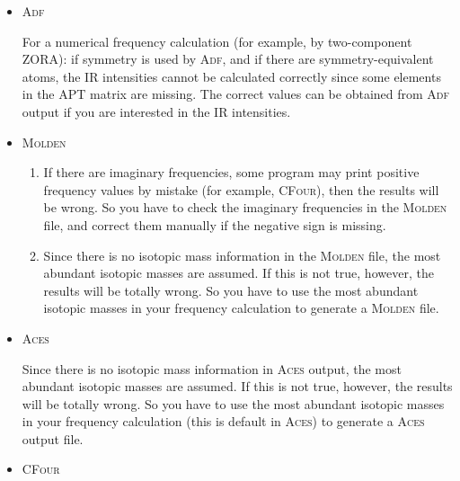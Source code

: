 \documentclass[12pt,english]{extarticle}
\begin{document}
\begin{itemize}
\item \textsc{Adf}

For a numerical frequency calculation (for example, by two-component ZORA): if symmetry is used by \textsc{Adf}, and if
there are symmetry-equivalent atoms, the IR intensities cannot be calculated correctly since some elements in the APT matrix are
missing. The correct values can be obtained from \textsc{Adf} output if you are interested in the IR intensities.

\item \textsc{Molden}

\begin{enumerate}
\item If there are imaginary frequencies, some program may print positive frequency values
by mistake (for example, \textsc{CFour}), then the results will be wrong. So you have to
check the imaginary frequencies in the \textsc{Molden} file, and correct them manually
if the negative sign is missing.

\item Since there is no isotopic mass information in the \textsc{Molden} file, the most
abundant isotopic masses are assumed. If this is not true, however, the results
will be totally wrong. So you have to use the most abundant isotopic masses
in your frequency calculation to generate a \textsc{Molden} file.
\end{enumerate}

\item \textsc{Aces}

Since there is no isotopic mass information in \textsc{Aces} output, the most
abundant isotopic masses are assumed. If this is not true, however, the results
will be totally wrong. So you have to use the most abundant isotopic masses
in your frequency calculation (this is default in \textsc{Aces}) to generate a \textsc{Aces} output file.

\item \textsc{CFour}


\end{itemize}
\end{document}

